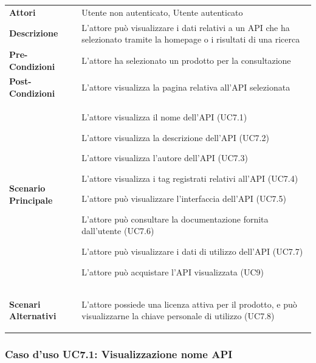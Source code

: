 \begin{longtable}{ l | p{11cm}}
	\hline
	\rowcolor{Gray}
	\multicolumn{2}{c}{UC7 - Visualizzazione API}\\
	\hline
	
	 \textbf{Attori} & Utente non autenticato, Utente autenticato  \\
	\textbf{Descrizione} & L'attore può visualizzare i dati relativi a un API che ha selezionato tramite la homepage o i risultati di una ricerca  \\
	\textbf{Pre-Condizioni} & L'attore ha selezionato un prodotto per la consultazione \\
	\textbf{Post-Condizioni} & L'attore visualizza la pagina relativa all'API selezionata\\
	\textbf{Scenario Principale} & 
	\begin{enumerate*}[label=(\arabic*.),itemjoin={\newline}]
		\item L'attore visualizza il nome dell'API (UC7.1)
		\item L'attore visualizza la descrizione dell'API (UC7.2)
		\item L'attore visualizza l'autore dell'API (UC7.3)
		\item L'attore visualizza i tag registrati relativi all'API (UC7.4)
		\item L'attore può visualizzare l'interfaccia dell'API (UC7.5)
		\item L'attore può consultare la documentazione fornita dall'utente (UC7.6)
		\item L'attore può visualizzare i dati di utilizzo dell'API  (UC7.7)
		\item L'attore può acquistare l'API visualizzata (UC9)
	\end{enumerate*}\\
	\textbf{Scenari Alternativi} & 
	\begin{enumerate*}[label=(\arabic*.),itemjoin={\newline}]
		\item L'attore possiede una licenza attiva per il prodotto, e può visualizzarne la chiave personale di utilizzo (UC7.8)
	\end{enumerate*}\\
\end{longtable}


\subsubsection{Caso d'uso UC7.1: Visualizzazione nome API}
\label{UC7_1}

